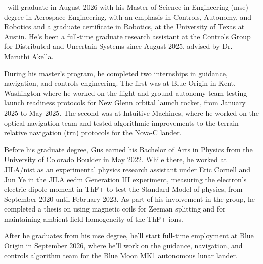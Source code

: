 \begin{vita}

\theauthor\ will graduate in August 2026 with his Master of Science in Engineering (\acs{mse}) degree in Aerospace Engineering, with an emphasis in Controls, Autonomy, and Robotics and a graduate certificate in Robotics, at the University of Texas at Austin. He's been a full-time graduate research assistant at the Controls Group for Distributed and Uncertain Systems since August 2025, advised by Dr. Maruthi Akella.

During his master's program, he completed two internships in guidance, navigation, and controls engineering. The first was at Blue Origin in Kent, Washington where he worked on the flight and ground autonomy team testing launch readiness protocols for New Glenn orbital launch rocket, from January 2025 to May 2025. The second was at Intuitive Machines, where he worked on the optical navigation team and tested algorithmic improvements to the terrain relative navigation (\acs{trn}) protocols for the Nova-C lander.

Before his graduate degree, Gus earned his Bachelor of Arts in Physics from the University of Colorado Boulder in May 2022. While there, he worked at JILA/\acs{nist} as an experimental physics research assistant under Eric Cornell and Jun Ye in the JILA \acs{eedm} Generation III experiment, measuring the electron's electric dipole moment in ThF+ to test the Standard Model of physics, from September 2020 until February 2023. As part of his involvement in the group, he completed a thesis on using magnetic coils for Zeeman splitting and for maintaining ambient-field homogeneity of the ThF+ ions.

After he graduates from his \acs{mse} degree, he'll start full-time employment at Blue Origin in September 2026, where he'll work on the guidance, navigation, and controls algorithm team for the Blue Moon MK1 autonomous lunar lander.




\end{vita}
